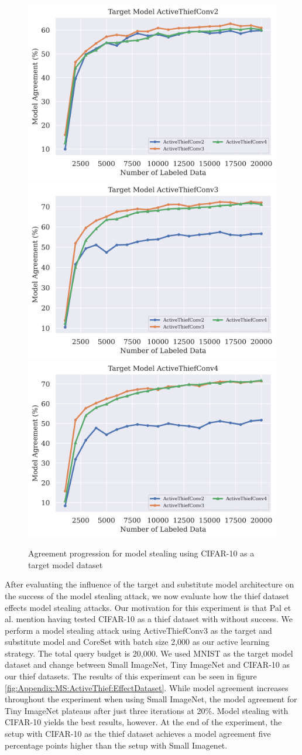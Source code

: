 \begin{figure}[!htb]
    \centering
    \includegraphics[width=0.32\linewidth]{images/MSInsights/cifar_act2.png} \hfill
    \includegraphics[width=0.32\linewidth]{images/MSInsights/cifar_act3.png} \hfill
    \includegraphics[width=0.32\linewidth]{images/MSInsights/cifar_act4.png}
    \caption{Agreement progression for model stealing using CIFAR-10 as a target model dataset}
    \label{fig:CIFAR10modelComp}
\end{figure}


After evaluating the influence of the target and substitute model architecture on the success of the model stealing attack, we now evaluate how the thief dataset effects
model stealing attacks. Our motivation for this experiment is that Pal et al.  mention having tested CIFAR-10 as a thief dataset with without success. We perform a model
stealing attack using ActiveThiefConv3 as the target and substitute model and CoreSet with batch size 2,000 as our active learning strategy. The total query budget is 20,000.
We used MNIST as the target model dataset and change between Small ImageNet, Tiny ImageNet and CIFAR-10 as our thief datasets. The results of this experiment can be seen
in figure \ref{fig:Appendix:MS:ActiveThief:EffectDataset}. While model agreement increases throughout the experiment when using Small ImageNet, the model agreement for
Tiny ImageNet plateaus after just three iterations at 20\%. Model stealing with CIFAR-10 yields the best results, however. At the end of the experiment, the setup with
CIFAR-10 as the thief dataset achieves a model agreement five percentage points higher than the setup with Small Imagenet. \par

